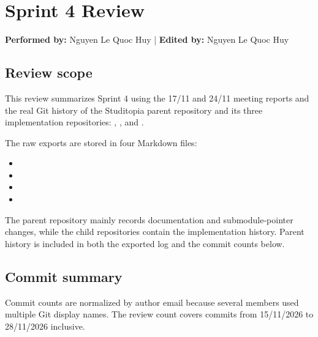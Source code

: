 \documentclass[12pt]{article}
\begin{document}

\section{Sprint 4 Review}

\textbf{Performed by:} Nguyen Le Quoc Huy | \textbf{Edited by:} Nguyen Le Quoc Huy

\subsection{Review scope}

This review summarizes Sprint 4 using the 17/11 and 24/11 meeting reports and the real Git history of the Studitopia parent repository and its three implementation repositories: \texttt{}, \texttt{}, and \texttt{}.

The raw \texttt{} exports are stored in four Markdown files:

\begin{itemize}

\item \texttt{}

\item \texttt{}

\item \texttt{}

\item \texttt{}

\end{itemize}

The parent repository mainly records documentation and submodule-pointer changes, while the child repositories contain the implementation history. Parent history is included in both the exported log and the commit counts below.

\subsection{Commit summary}

Commit counts are normalized by author email because several members used multiple Git display names. The review count covers commits from 15/11/2026 to 28/11/2026 inclusive.
\end{document}
